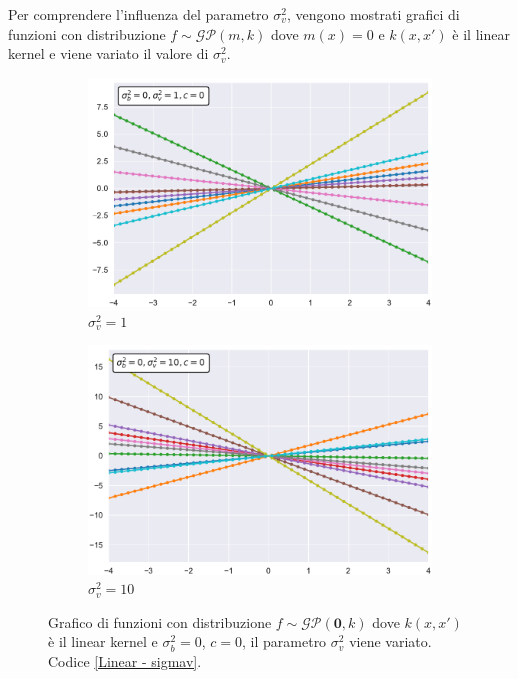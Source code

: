 \newpage

Per comprendere l'influenza del parametro $\sigma_v^2$, vengono mostrati grafici di funzioni con distribuzione $f\sim \mathcal{GP}(m,k)$ dove $m(x)=0$ e $k(x,x')$ è il linear kernel e viene variato il valore di $\sigma_v^2$.


\begin{figure}[h]
\centering
\begin{subfigure}{.5\textwidth}
  \centering
  \includegraphics[width=\linewidth]{images/Gaussian process/Linear - sigmav=1.pdf}
  \caption{$\sigma_v^2=1$}
\end{subfigure}%
\begin{subfigure}{.5\textwidth}
  \centering
  \includegraphics[width=\linewidth]{images/Gaussian process/Linear - sigmav=10.pdf}
  \caption{$\sigma_v^2=10$}
\end{subfigure}
\caption{Grafico di funzioni con distribuzione $f\sim \mathcal{GP}(\bm{0},k)$ dove $k(x,x')$ è il linear kernel e $\sigma_b^2=0$, $c=0$, il parametro $\sigma_v^2$ viene variato. Codice \ref{Linear - sigmav}.}
\label{10 sample linear modified sigmav}
\end{figure}

